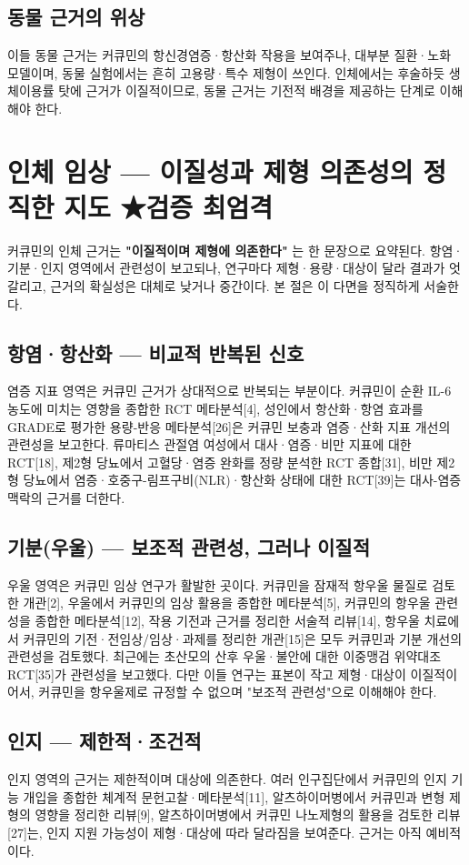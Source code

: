 \documentclass[11pt,oneside]{book}
\begin{document}
\subsection{동물 근거의 위상}
이들 동물 근거는 커큐민의 항신경염증·항산화 작용을 보여주나, 대부분 질환·노화 모델이며, 동물 실험에서는 흔히 고용량·특수 제형이 쓰인다. 인체에서는 후술하듯 생체이용률 탓에 근거가 이질적이므로, 동물 근거는 기전적 배경을 제공하는 단계로 이해해야 한다.

\section{인체 임상 — 이질성과 제형 의존성의 정직한 지도 ★검증 최엄격}
커큐민의 인체 근거는 \textbf{"이질적이며 제형에 의존한다"} 는 한 문장으로 요약된다. 항염·기분·인지 영역에서 관련성이 보고되나, 연구마다 제형·용량·대상이 달라 결과가 엇갈리고, 근거의 확실성은 대체로 낮거나 중간이다. 본 절은 이 다면을 정직하게 서술한다.

\subsection{항염·항산화 — 비교적 반복된 신호}
염증 지표 영역은 커큐민 근거가 상대적으로 반복되는 부분이다. 커큐민이 순환 IL-6 농도에 미치는 영향을 종합한 RCT 메타분석[4], 성인에서 항산화·항염 효과를 GRADE로 평가한 용량-반응 메타분석[26]은 커큐민 보충과 염증·산화 지표 개선의 관련성을 보고한다. 류마티스 관절염 여성에서 대사·염증·비만 지표에 대한 RCT[18], 제2형 당뇨에서 고혈당·염증 완화를 정량 분석한 RCT 종합[31], 비만 제2형 당뇨에서 염증·호중구-림프구비(NLR)·항산화 상태에 대한 RCT[39]는 대사-염증 맥락의 근거를 더한다.

\subsection{기분(우울) — 보조적 관련성, 그러나 이질적}
우울 영역은 커큐민 임상 연구가 활발한 곳이다. 커큐민을 잠재적 항우울 물질로 검토한 개관[2], 우울에서 커큐민의 임상 활용을 종합한 메타분석[5], 커큐민의 항우울 관련성을 종합한 메타분석[12], 작용 기전과 근거를 정리한 서술적 리뷰[14], 항우울 치료에서 커큐민의 기전·전임상/임상·과제를 정리한 개관[15]은 모두 커큐민과 기분 개선의 관련성을 검토했다. 최근에는 초산모의 산후 우울·불안에 대한 이중맹검 위약대조 RCT[35]가 관련성을 보고했다. 다만 이들 연구는 표본이 작고 제형·대상이 이질적이어서, 커큐민을 항우울제로 규정할 수 없으며 "보조적 관련성"으로 이해해야 한다.

\subsection{인지 — 제한적·조건적}
인지 영역의 근거는 제한적이며 대상에 의존한다. 여러 인구집단에서 커큐민의 인지 기능 개입을 종합한 체계적 문헌고찰·메타분석[11], 알츠하이머병에서 커큐민과 변형 제형의 영향을 정리한 리뷰[9], 알츠하이머병에서 커큐민 나노제형의 활용을 검토한 리뷰[27]는, 인지 지원 가능성이 제형·대상에 따라 달라짐을 보여준다. 근거는 아직 예비적이다.
\end{document}

